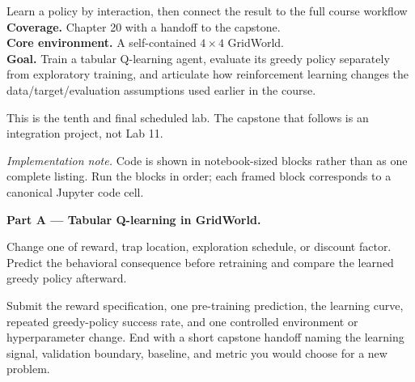 
\begin{labproject}{Learn a policy by interaction, then connect the result to the full course workflow}
\textbf{Coverage.} Chapter 20 with a handoff to the capstone.\\
\textbf{Core environment.} A self-contained $4\times4$ GridWorld.\\
\textbf{Goal.} Train a tabular Q-learning agent, evaluate its greedy policy separately from exploratory training, and articulate how reinforcement learning changes the data/target/evaluation assumptions used earlier in the course.

\begin{labmode}
This is the tenth and final scheduled lab. The capstone that follows is an integration project, not Lab 11.
\end{labmode}

\smallskip\noindent\textit{Implementation note.} Code is shown in notebook-sized blocks rather than as one complete listing. Run the blocks in order; each framed block corresponds to a canonical Jupyter code cell.\par

\medskip\noindent\textbf{Part A --- Tabular Q-learning in GridWorld.}\par








\begin{tryit}
Change one of reward, trap location, exploration schedule, or discount factor. Predict the behavioral consequence before retraining and compare the learned greedy policy afterward.
\end{tryit}
\end{labproject}

\begin{labdeliverable}
Submit the reward specification, one pre-training prediction, the learning curve, repeated greedy-policy success rate, and one controlled environment or hyperparameter change. End with a short capstone handoff naming the learning signal, validation boundary, baseline, and metric you would choose for a new problem.
\end{labdeliverable}
